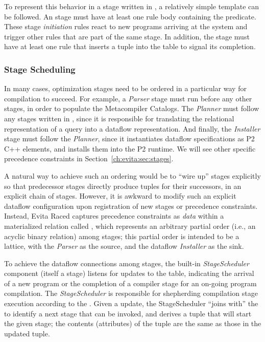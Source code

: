 To represent this behavior in a stage written in \OVERLOG, a relatively simple
template can be followed.  An \OVERLOG stage must have at least one rule body
containing the  predicate.  These stage {\em
initiation} rules react to new programs arriving at the system and trigger
other rules that are part of the same stage.  In addition, the stage must have
at least one rule that inserts a  tuple into the  table
to signal its completion. 

\subsubsection{Stage Scheduling}
\label{ch:evita:sec:stageschedule}

In many cases, optimization stages need to be ordered in a particular way for
compilation to succeed.  For example, a {\em Parser} stage must run before any
other stages, in order to populate the Metacompiler Catalogs.  The {\em
Planner} must follow any stages written in \OVERLOG, since it is responsible
for translating the relational representation of a query into a dataflow
representation.  And finally, the {\em Installer} stage must follow the {\em
Planner}, since it instantiates dataflow specifications as P2 C++ elements, and
installs them into the P2 runtime.  We will see other specific precedence
constraints in Section~\ref{ch:evita:sec:stages}.

A natural way to achieve such an ordering would be to ``wire up'' stages
explicitly so that predecessor stages directly produce
 tuples for their successors, in an explicit chain of
stages.  However, it is awkward to modify such an explicit dataflow
configuration upon registration of new stages or precedence constraints.
Instead, Evita Raced captures precedence constraints as {\em data} within a
materialized relation called , which represents an arbitrary
partial order (i.e., an acyclic binary relation) among stages; this partial
order is intended to be a lattice, with the {\em Parser} as the source, and the
dataflow {\em Installer} as the sink.  
 
To achieve the dataflow connections among stages, the built-in {\em
StageScheduler} component (itself a stage) listens for updates to the
 table, indicating the arrival of a new \OVERLOG program or the
completion of a compiler stage for an on-going program compilation.  The {\em
StageScheduler} is responsible for shepherding compilation stage execution
according to the .  Given a  update, the
StageScheduler ``joins with'' the  to identify a next stage
that can be invoked, and derives a  tuple that will
start the given stage; the contents (attributes) of the
 tuple are the same as those in the updated
 tuple.

